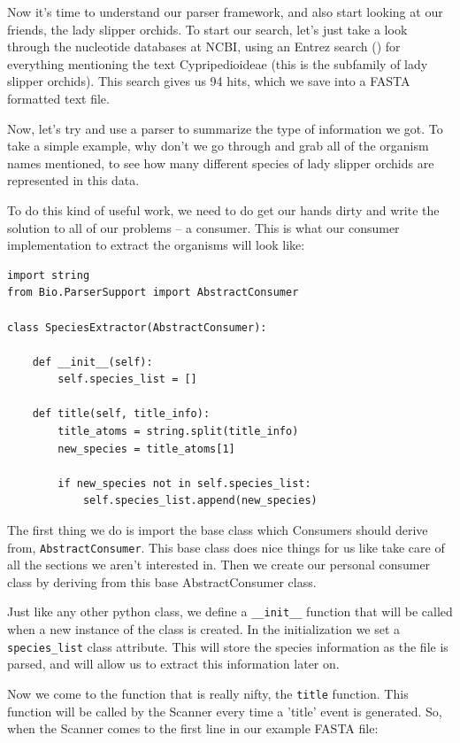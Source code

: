 \documentclass{report}
\begin{document}
Now it's time to understand our parser framework, and also start looking at our friends, the lady slipper orchids. To start our search, let's just take a look through the nucleotide databases at NCBI, using an Entrez search () for everything mentioning the text Cypripedioideae (this is the subfamily of lady slipper orchids). This search gives us 94 hits, which we save into a FASTA formatted text file.


Now, let's try and use a parser to summarize the type of information we got. To take a simple example, why don't we go through and grab all of the organism names mentioned, to see how many different species of lady slipper orchids are represented in this data.


To do this kind of useful work, we need to do get our hands dirty and write the solution to all of our problems -- a consumer. This is what our consumer implementation to extract the organisms will look like:

\begin{verbatim}
import string
from Bio.ParserSupport import AbstractConsumer

class SpeciesExtractor(AbstractConsumer):

    def __init__(self):
        self.species_list = []

    def title(self, title_info):
        title_atoms = string.split(title_info)
        new_species = title_atoms[1]

        if new_species not in self.species_list:
            self.species_list.append(new_species)
\end{verbatim}

The first thing we do is import the base class which Consumers should derive from, \verb|AbstractConsumer|. This base class does nice things for us like take care of all the sections we aren't interested in. Then we create our personal consumer class by deriving from this base AbstractConsumer class.


Just like any other python class, we define a \verb|__init__| function that will be called when a new instance of the class is created. In the initialization we set a \verb|species_list| class attribute. This will store the species information as the file is parsed, and will allow us to extract this information later on.


Now we come to the function that is really nifty, the \verb|title| function. This function will be called by the Scanner every time a 'title' event is generated. So, when the Scanner comes to the first line in our example FASTA file:
\end{document}
